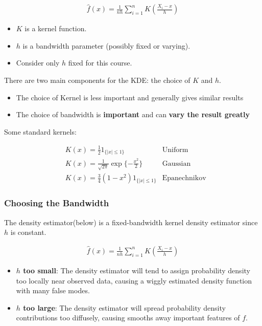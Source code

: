 \begin{align*}
    \hat{f}(x) = \frac{1}{nh}\sum_{i=1}^{n}K(\frac{X_i-x}{h})
\end{align*}

\begin{itemize}
    \item $K$ is a kernel function.
    \item $h$ is a bandwidth parameter (possibly fixed or varying).
    \item Consider only $h$ fixed for this course.
\end{itemize}

There are two main components for the KDE: the choice of $K$ and $h$.

\begin{itemize}
    \item The choice of Kernel is less important and generally gives similar results
    \item The choice of bandwidth is \textbf{important} and can \textbf{vary the result greatly}
\end{itemize}

Some standard kernels:

\begin{align*}
    & K(x) = \frac{1}{2}1_{\{|x|\leq 1\}} & \text{Uniform}\\
    & K(x) = \frac{1}{\sqrt{2\pi}}\exp{\{-\frac{x^2}{2}\}} & \text{Gaussian}\\
    & K(x) = \frac{3}{4}(1-x^2)1_{\{|x|\leq 1\}} & \text{Epanechnikov}
\end{align*}

\subsubsection{Choosing the Bandwidth}

\indent

The density estimator(below) is a fixed-bandwidth kernel density estimator since $h$ is constant.

\begin{align*}
    \hat{f}(x) = \frac{1}{nh}\sum_{i=1}^{n}K(\frac{X_i-x}{h})
\end{align*}

\begin{itemize}
    \item \textbf{$h$ too small}: The density estimator will tend to assign probability density too locally near observed data, causing a wiggly estimated density function with many false modes.
    \item \textbf{$h$ too large}: The density estimator will spread probability density contributions too diffusely, causing smooths away important features of $f$.
\end{itemize}

